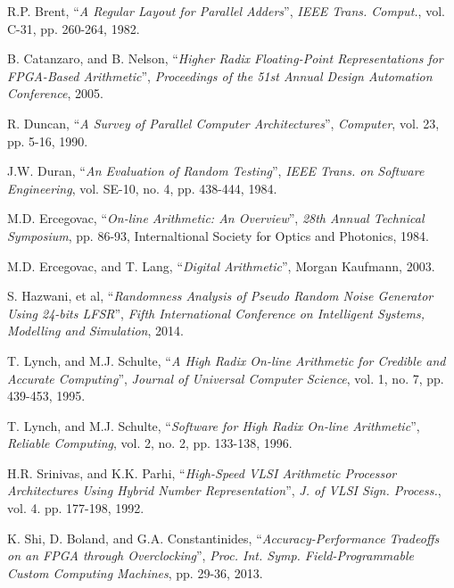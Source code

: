 \begin{thebibliography}{1}



  R.P. Brent,
  ``\textit{A Regular Layout for Parallel Adders}'',
  \textit{IEEE Trans. Comput.}, vol. C-31, pp. 260-264,
  1982.

  B. Catanzaro, and B. Nelson,
  ``\textit{Higher Radix Floating-Point Representations for FPGA-Based
  Arithmetic}'',
  \textit{Proceedings of the 51st Annual Design Automation Conference},
  2005.

  R. Duncan,
  ``\textit{A Survey of Parallel Computer Architectures}'',
  \textit{Computer}, vol. 23, pp. 5-16,
  1990.

  J.W. Duran,
  ``\textit{An Evaluation of Random Testing}'',
  \textit{IEEE Trans. on Software Engineering}, vol. SE-10, no. 4, pp. 438-444,
  1984.

  M.D. Ercegovac,
  ``\textit{On-line Arithmetic: An Overview}'',
  \textit{28th Annual Technical Symposium}, pp. 86-93,
  Internaltional Society for Optics and Photonics,
  1984.

  M.D. Ercegovac, and T. Lang,
  ``\textit{Digital Arithmetic}'',
  Morgan Kaufmann,
  2003.

  S. Hazwani, et al,
  ``\textit{Randomness Analysis of Pseudo Random Noise Generator Using 24-bits
  LFSR}'',
  \textit{Fifth International Conference on Intelligent Systems, Modelling
  and Simulation},
  2014.

  T. Lynch, and M.J. Schulte,
  ``\textit{A High Radix On-line Arithmetic for Credible and Accurate
  Computing}'',
  \textit{Journal of Universal Computer Science}, vol. 1, no. 7, pp. 439-453,
  1995.

  T. Lynch, and M.J. Schulte,
  ``\textit{Software for High Radix On-line Arithmetic}'',
  \textit{Reliable Computing}, vol. 2, no. 2, pp. 133-138,
  1996.

  H.R. Srinivas, and K.K. Parhi,
  ``\textit{High-Speed VLSI Arithmetic Processor Architectures Using Hybrid
  Number Representation}'',
  \textit{J. of VLSI Sign. Process.}, vol. 4. pp. 177-198,
  1992.

  K. Shi, D. Boland, and G.A. Constantinides,
  ``\textit{Accuracy-Performance Tradeoffs on an FPGA through Overclocking}'',
  \textit{Proc. Int. Symp. Field-Programmable Custom Computing Machines},
  pp. 29-36,
  2013.


\end{thebibliography}
